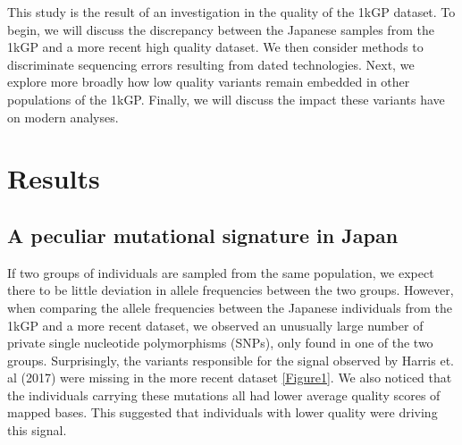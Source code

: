 \documentclass[9pt,lineno]{elife}
\begin{document}
This study is the result of an investigation in the quality of the 1kGP dataset.
To begin, we will discuss the discrepancy between the Japanese samples from the 1kGP and a more recent high quality dataset. 
We then consider methods to discriminate sequencing errors resulting from dated technologies.
Next, we explore more broadly how low quality variants remain embedded in other populations of the 1kGP.
Finally, we will discuss the impact these variants have on modern analyses.

			\section{Results}
	\subsection{A peculiar mutational signature in Japan}			
If two groups of individuals are sampled from the same population, we expect there to be little deviation in allele frequencies between the two groups.
However, when comparing the allele frequencies between the Japanese individuals from the 1kGP and a more recent dataset, we observed an unusually large number of private single nucleotide polymorphisms (SNPs), only found in one of the two groups.
Surprisingly, the variants responsible for the signal observed by Harris et. al (2017) were missing in the more recent dataset \ref{Figure1}. 
We also noticed that the individuals carrying these mutations all had lower average quality scores of mapped bases.
This suggested that individuals with lower quality were driving this signal.
\end{document}
